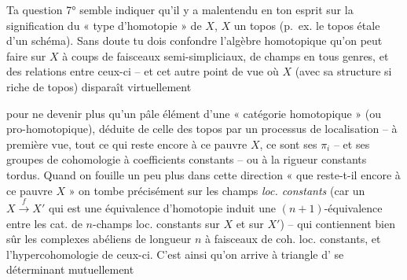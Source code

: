 \documentclass[11pt,a4paper]{article}
\begin{document}
Ta question 7° semble indiquer qu'il y a malentendu en ton esprit sur la signification du « type d'homotopie » de $X$, $X$ un topos (p.~ex. le topos étale d'un schéma). Sans doute tu dois confondre l'algèbre homotopique qu'on peut faire sur $X$ à coups de faisceaux semi-simpliciaux, de champs en tous genres, et des relations entre ceux-ci -- et cet autre point de vue où $X$ (avec sa structure si riche de topos) disparaît virtuellement

pour ne devenir plus qu'un pâle élément d'une « catégorie homotopique » (ou pro-homotopique), déduite de celle des topos par un processus de localisation \ill{} -- à première vue, tout ce qui reste encore à ce pauvre $X$, ce sont ses $\pi_i$ -- et ses groupes de cohomologie à coefficients constants -- ou à la rigueur constants tordus. Quand on fouille un peu plus dans cette direction « que reste-t-il encore à ce pauvre $X$ » on tombe précisément sur les champs \emph{loc. constants} (car un $X \xrightarrow{f} X'$ qui est une équivalence d'homotopie induit une $(n+1)$-équivalence entre les cat. de $n$-champs loc. constants sur $X$ et sur $X'$) -- qui contiennent bien sûr les complexes  abéliens de longueur $n$ à faisceaux de coh. loc. constants, et l'hypercohomologie de ceux-ci. C'est ainsi qu'on arrive à \struck{\ill{}}  triangle d'\struck{\ill{}}  se déterminant mutuellement


\end{document}
